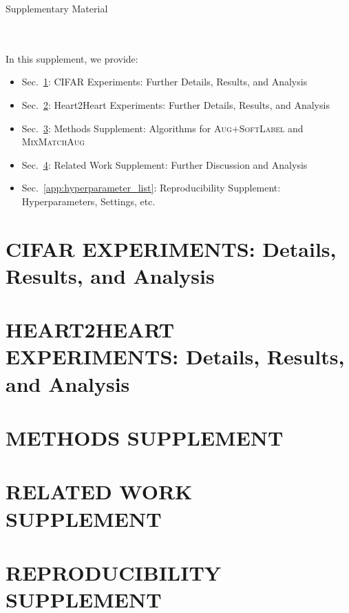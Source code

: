 \documentclass[twoside]{article}
\begin{document}
\begin{center}
\Large Supplementary Material
\end{center}
~\\
~\\
In this supplement, we provide:
\begin{itemize}
  \setlength\itemsep{0em}
\item Sec.~\ref{app:cifar}: CIFAR Experiments: Further Details, Results, and Analysis 
\item Sec.~\ref{app:heart2heart}: Heart2Heart Experiments: Further Details, Results, and Analysis
\item Sec.~\ref{app:methods}: Methods Supplement: Algorithms for \textsc{Aug+SoftLabel} and \textsc{MixMatchAug}
\item Sec.~\ref{app:related_work}: Related Work Supplement: Further Discussion and Analysis 
\item Sec.~\ref{app:hyperparameter_list}: Reproducibility Supplement: Hyperparameters, Settings, etc.
\end{itemize}

\section{CIFAR EXPERIMENTS: Details, Results, and Analysis}
\label{app:cifar}




\section{HEART2HEART EXPERIMENTS: Details, Results, and Analysis}
\label{app:heart2heart}


\section{METHODS SUPPLEMENT}
\label{app:methods}



\section{RELATED WORK SUPPLEMENT}
\label{app:related_work}


\section{REPRODUCIBILITY SUPPLEMENT}
\label{app:experiment_details}
\label{app:hyperparameter_list}


% 
\end{document}
